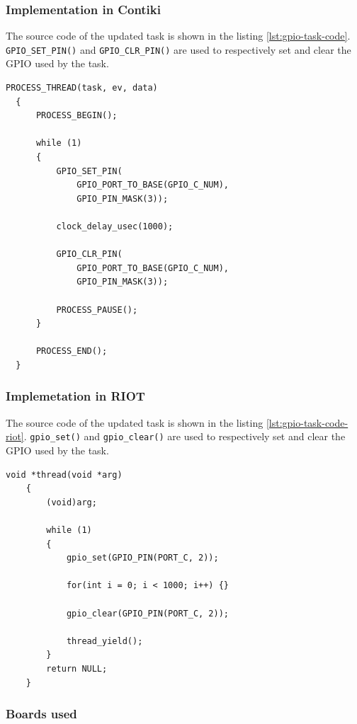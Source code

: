 \subsubsection{Implementation in Contiki}
The source code of the updated task is shown in the listing \ref{lst:gpio-task-code}.
\texttt{GPIO\_SET\_PIN()} and \texttt{GPIO\_CLR\_PIN()} are used to respectively set and clear the GPIO used by the task.

\begin{lstlisting}[style=CStyle, float, label={lst:gpio-task-code}, caption={Source code of the task with GPIO calls}]
  PROCESS_THREAD(task, ev, data)
  {
      PROCESS_BEGIN();
  
      while (1)
      {
          GPIO_SET_PIN(
              GPIO_PORT_TO_BASE(GPIO_C_NUM), 
              GPIO_PIN_MASK(3));

          clock_delay_usec(1000);

          GPIO_CLR_PIN(
              GPIO_PORT_TO_BASE(GPIO_C_NUM), 
              GPIO_PIN_MASK(3));

          PROCESS_PAUSE();
      }
  
      PROCESS_END();
  }
\end{lstlisting}

\subsubsection{Implemetation in RIOT}
The source code of the updated task is shown in the listing \ref{lst:gpio-task-code-riot}.
\texttt{gpio\_set()} and \texttt{gpio\_clear()} are used to respectively set and clear the GPIO used by the task.

\begin{lstlisting}[style=CStyle, float, label={lst:gpio-task-code-riot}, caption={Source code of a task implemented in RIOT for the simple application}]
    void *thread(void *arg)
    {
        (void)arg;
    
        while (1)
        {
            gpio_set(GPIO_PIN(PORT_C, 2));

            for(int i = 0; i < 1000; i++) {}

            gpio_clear(GPIO_PIN(PORT_C, 2));

            thread_yield();
        }
        return NULL;
    }
    \end{lstlisting}

\subsubsection{Boards used}

